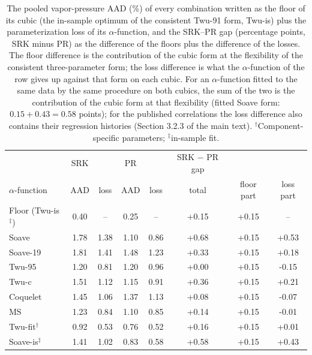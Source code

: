 \begin{table}[H]
\centering
\caption{The pooled vapor-pressure AAD (\%) of every combination written as the floor of its cubic (the in-sample optimum of the consistent Twu-91 form, Twu-is) plus the parameterization loss of its $\alpha$-function, and the SRK--PR gap (percentage points, SRK minus PR) as the difference of the floors plus the difference of the losses. The floor difference is the contribution of the cubic form at the flexibility of the consistent three-parameter form; the loss difference is what the $\alpha$-function of the row gives up against that form on each cubic. For an $\alpha$-function fitted to the same data by the same procedure on both cubics, the sum of the two is the contribution of the cubic form at that flexibility (fitted Soave form: $0.15 + 0.43 = 0.58$ points); for the published correlations the loss difference also contains their regression histories (Section 3.2.3 of the main text). $^{\dagger}$Component-specific parameters; $^{\ddagger}$in-sample fit.}
\label{tab:tabS_floorloss}
\small
\begin{tabular}{lccccccc}
\toprule
 & SRK &  & PR &  & SRK $-$ PR gap &  &  \\
$\alpha$-function & AAD & loss & AAD & loss & total & floor part & loss part \\
\midrule
Floor (Twu-is$^{\ddagger}$) & 0.40 & -- & 0.25 & -- & +0.15 & +0.15 & -- \\
Soave & 1.78 & 1.38 & 1.10 & 0.86 & +0.68 & +0.15 & +0.53 \\
Soave-19 & 1.81 & 1.41 & 1.48 & 1.23 & +0.33 & +0.15 & +0.18 \\
Twu-95 & 1.20 & 0.81 & 1.20 & 0.96 & +0.00 & +0.15 & -0.15 \\
Twu-c & 1.51 & 1.12 & 1.15 & 0.91 & +0.36 & +0.15 & +0.21 \\
Coquelet & 1.45 & 1.06 & 1.37 & 1.13 & +0.08 & +0.15 & -0.07 \\
MS & 1.23 & 0.84 & 1.10 & 0.85 & +0.14 & +0.15 & -0.01 \\
Twu-fit$^{\dagger}$ & 0.92 & 0.53 & 0.76 & 0.52 & +0.16 & +0.15 & +0.01 \\
Soave-is$^{\ddagger}$ & 1.41 & 1.02 & 0.83 & 0.58 & +0.58 & +0.15 & +0.43 \\
\bottomrule
\end{tabular}
\end{table}
